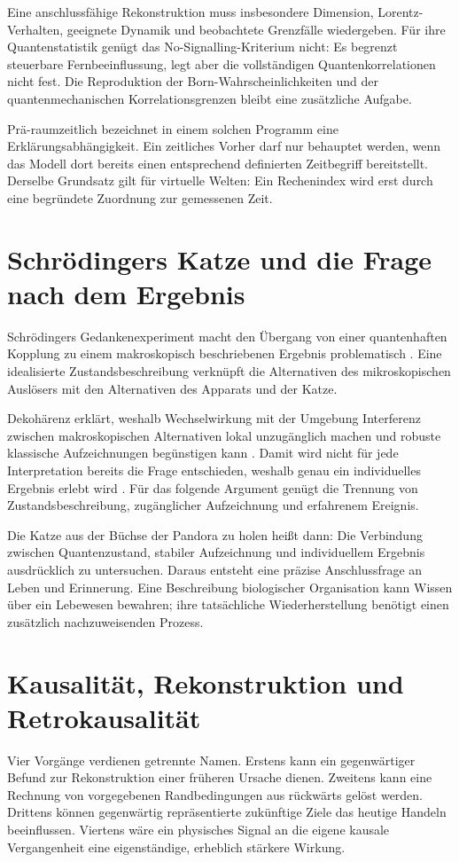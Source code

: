 Eine anschlussfähige Rekonstruktion muss insbesondere Dimension, Lorentz-Verhalten, geeignete Dynamik und beobachtete Grenzfälle wiedergeben. Für ihre Quantenstatistik genügt das No-Signalling-Kriterium nicht: Es begrenzt steuerbare Fernbeeinflussung, legt aber die vollständigen Quantenkorrelationen nicht fest. Die Reproduktion der Born-Wahrscheinlichkeiten und der quantenmechanischen Korrelationsgrenzen bleibt eine zusätzliche Aufgabe.

Prä-raumzeitlich bezeichnet in einem solchen Programm eine Erklärungsabhängigkeit. Ein zeitliches Vorher darf nur behauptet werden, wenn das Modell dort bereits einen entsprechend definierten Zeitbegriff bereitstellt. Derselbe Grundsatz gilt für virtuelle Welten: Ein Rechenindex wird erst durch eine begründete Zuordnung zur gemessenen Zeit.

\section{Schrödingers Katze und die Frage nach dem Ergebnis}\label{de:sec9}
Schrödingers Gedankenexperiment macht den Übergang von einer quantenhaften Kopplung zu einem makroskopisch beschriebenen Ergebnis problematisch \cite{4}. Eine idealisierte Zustandsbeschreibung verknüpft die Alternativen des mikroskopischen Auslösers mit den Alternativen des Apparats und der Katze.

Dekohärenz erklärt, weshalb Wechselwirkung mit der Umgebung Interferenz zwischen makroskopischen Alternativen lokal unzugänglich machen und robuste klassische Aufzeichnungen begünstigen kann \cite{5}. Damit wird nicht für jede Interpretation bereits die Frage entschieden, weshalb genau ein individuelles Ergebnis erlebt wird \cite{16}. Für das folgende Argument genügt die Trennung von Zustandsbeschreibung, zugänglicher Aufzeichnung und erfahrenem Ereignis.

Die Katze aus der Büchse der Pandora zu holen heißt dann: Die Verbindung zwischen Quantenzustand, stabiler Aufzeichnung und individuellem Ergebnis ausdrücklich zu untersuchen. Daraus entsteht eine präzise Anschlussfrage an Leben und Erinnerung. Eine Beschreibung biologischer Organisation kann Wissen über ein Lebewesen bewahren; ihre tatsächliche Wiederherstellung benötigt einen zusätzlich nachzuweisenden Prozess.

\section{Kausalität, Rekonstruktion und Retrokausalität}\label{de:sec10}
Vier Vorgänge verdienen getrennte Namen. Erstens kann ein gegenwärtiger Befund zur Rekonstruktion einer früheren Ursache dienen. Zweitens kann eine Rechnung von vorgegebenen Randbedingungen aus rückwärts gelöst werden. Drittens können gegenwärtig repräsentierte zukünftige Ziele das heutige Handeln beeinflussen. Viertens wäre ein physisches Signal an die eigene kausale Vergangenheit eine eigenständige, erheblich stärkere Wirkung.

